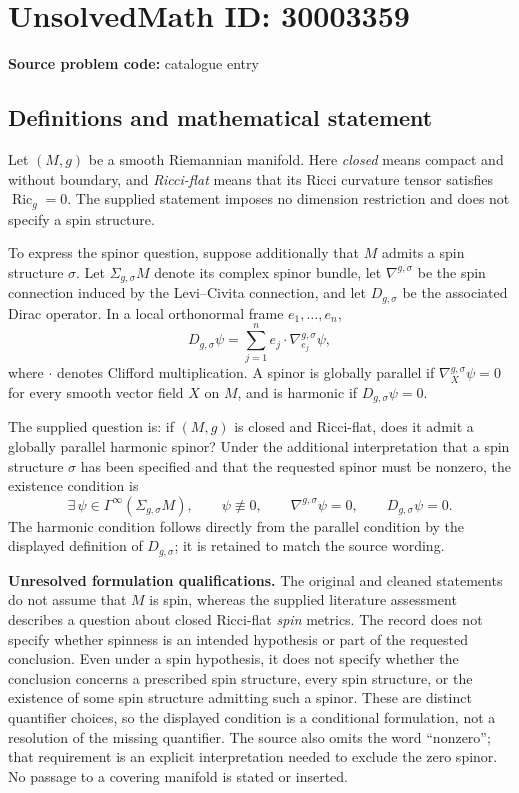 \documentclass[11pt]{article}
\begin{document}
\section*{UnsolvedMath ID: 30003359}
\textbf{Source problem code:} catalogue entry
\subsection{Definitions and mathematical statement}
Let \((M,g)\) be a smooth Riemannian manifold. Here \emph{closed} means compact and without boundary, and \emph{Ricci-flat} means that its Ricci curvature tensor satisfies \(\operatorname{Ric}_g=0\). The supplied statement imposes no dimension restriction and does not specify a spin structure.

To express the spinor question, suppose additionally that \(M\) admits a spin structure \(\sigma\). Let \(\Sigma_{g,\sigma}M\) denote its complex spinor bundle, let \(\nabla^{g,\sigma}\) be the spin connection induced by the Levi--Civita connection, and let \(D_{g,\sigma}\) be the associated Dirac operator. In a local orthonormal frame \(e_1,\ldots,e_n\),
\[
D_{g,\sigma}\psi=\sum_{j=1}^{n}e_j\mathbin{\cdot}\nabla^{g,\sigma}_{e_j}\psi,
\]
where \(\mathbin{\cdot}\) denotes Clifford multiplication. A spinor is globally parallel if \(\nabla^{g,\sigma}_X\psi=0\) for every smooth vector field \(X\) on \(M\), and is harmonic if \(D_{g,\sigma}\psi=0\).

The supplied question is: if \((M,g)\) is closed and Ricci-flat, does it admit a globally parallel harmonic spinor? Under the additional interpretation that a spin structure \(\sigma\) has been specified and that the requested spinor must be nonzero, the existence condition is
\[
\exists\,\psi\in\Gamma^{\infty}(\Sigma_{g,\sigma}M),\qquad
\psi\not\equiv0,\qquad
\nabla^{g,\sigma}\psi=0,\qquad
D_{g,\sigma}\psi=0.
\]
The harmonic condition follows directly from the parallel condition by the displayed definition of \(D_{g,\sigma}\); it is retained to match the source wording.

\textbf{Unresolved formulation qualifications.} The original and cleaned statements do not assume that \(M\) is spin, whereas the supplied literature assessment describes a question about closed Ricci-flat \emph{spin} metrics. The record does not specify whether spinness is an intended hypothesis or part of the requested conclusion. Even under a spin hypothesis, it does not specify whether the conclusion concerns a prescribed spin structure, every spin structure, or the existence of some spin structure admitting such a spinor. These are distinct quantifier choices, so the displayed condition is a conditional formulation, not a resolution of the missing quantifier. The source also omits the word ``nonzero''; that requirement is an explicit interpretation needed to exclude the zero spinor. No passage to a covering manifold is stated or inserted.
\end{document}
